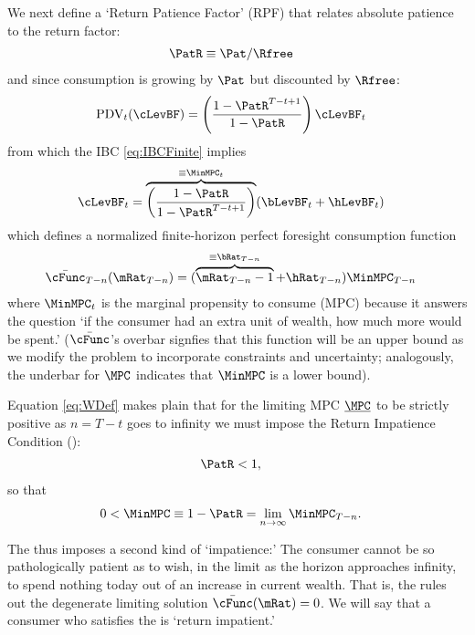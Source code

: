 \documentclass[BufferStockTheory]{subfiles}
\begin{document}
We next define a `Return Patience Factor' (RPF) that relates absolute patience to the return factor:
\begin{align}
  \PatR  & \equiv  {\Pat}/\Rfree \label{eq:PatR}
\end{align}
and since consumption is growing by $\Pat$ but discounted by $\Rfree$:
\begin{align}
  \text{PDV}_{t}(\cLevBF)  & = \left(\frac{1-\PatR^{T-t+1}}{1-\PatR}\right)\cLevBF_{t}
\end{align}
from which the IBC \eqref{eq:IBCFinite} implies
\begin{align}
  \cLevBF_{t}  & = \overbrace{\left(\frac{1-\PatR}{1-\PatR^{T-t+1}}\right)}^{\equiv \MinMPC_{t}}
                 (\bLevBF_{t}+\hLevBF_{t})   \label{eq:WDef}
\end{align}
which defines a normalized finite-horizon perfect foresight consumption function
\begin{align}
  \bar{\cFunc}_{T-n}(\mRat_{T-n})  & = (\overbrace{\mRat_{T-n}-1}^{
                                     \equiv\bRat_{T-n}}+\hRat_{T-n})\MinMPC_{T-n}
\end{align}
where $\MinMPC_{t}$ is the marginal propensity to consume (MPC) because it answers the
question `if the consumer had an extra unit of wealth, how much more would be spent.' \hypertarget{RIC}{}
($\bar{\cFunc}$'s overbar signfies that this function will be an upper bound as we modify the problem to incorporate constraints and uncertainty; analogously, the underbar for $\MPC$ indicates that $\MinMPC$ is a lower bound).

Equation \eqref{eq:WDef} makes plain that for the limiting MPC $\underbar{\MPC}$ to be strictly positive as $n=T-t$ goes to infinity we must impose the Return Impatience Condition (\RIC):
\begin{align}
  \PatR  & < 1   \label{eq:RIC},
\end{align}
so that
\begin{align}
  0 <  \MinMPC  & \equiv   1-\PatR = \lim_{n \rightarrow \infty} \MinMPC_{T-n} \label{eq:MinMPCDef}
                  .
\end{align}

The {\RIC} thus imposes a second kind of `impatience:' The consumer cannot be so pathologically patient as to wish, in the limit as the horizon approaches infinity, to spend nothing today out of an increase in current wealth. That is, the {\RIC} rules out the degenerate limiting solution $\bar{\cFunc}(\mRat)=0$.  We will say that a consumer who satisfies the {\RIC} is `return impatient.'
\end{document}
